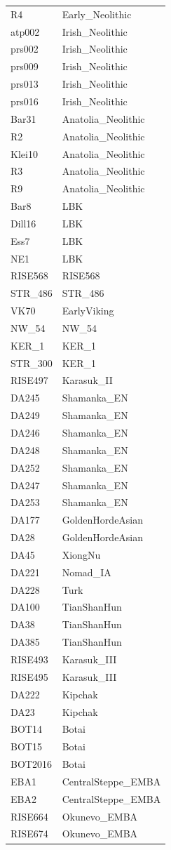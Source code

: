 \begin{longtable}[t]{ll}
R4 & Early\_Neolithic\\
atp002 & Irish\_Neolithic\\
prs002 & Irish\_Neolithic\\
prs009 & Irish\_Neolithic\\
prs013 & Irish\_Neolithic\\
prs016 & Irish\_Neolithic\\
Bar31 & Anatolia\_Neolithic\\
R2 & Anatolia\_Neolithic\\
Klei10 & Anatolia\_Neolithic\\
R3 & Anatolia\_Neolithic\\
R9 & Anatolia\_Neolithic\\
Bar8 & LBK\\
Dill16 & LBK\\
Ess7 & LBK\\
NE1 & LBK\\
RISE568 & RISE568\\
STR\_486 & STR\_486\\
VK70 & EarlyViking\\
NW\_54 & NW\_54\\
KER\_1 & KER\_1\\
STR\_300 & KER\_1\\
RISE497 & Karasuk\_II\\
DA245 & Shamanka\_EN\\
DA249 & Shamanka\_EN\\
DA246 & Shamanka\_EN\\
DA248 & Shamanka\_EN\\
DA252 & Shamanka\_EN\\
DA247 & Shamanka\_EN\\
DA253 & Shamanka\_EN\\
DA177 & GoldenHordeAsian\\
DA28 & GoldenHordeAsian\\
DA45 & XiongNu\\
DA221 & Nomad\_IA\\
DA228 & Turk\\
DA100 & TianShanHun\\
DA38 & TianShanHun\\
DA385 & TianShanHun\\
RISE493 & Karasuk\_III\\
RISE495 & Karasuk\_III\\
DA222 & Kipchak\\
DA23 & Kipchak\\
BOT14 & Botai\\
BOT15 & Botai\\
BOT2016 & Botai\\
EBA1 & CentralSteppe\_EMBA\\
EBA2 & CentralSteppe\_EMBA\\
RISE664 & Okunevo\_EMBA\\
RISE674 & Okunevo\_EMBA\\*
\end{longtable}
\endgroup{}



